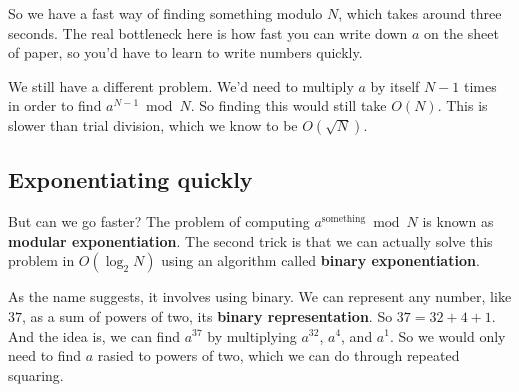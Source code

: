 \documentclass[11pt,paper=letter]{scrartcl}
\begin{document}



So we have a fast way of finding something modulo $N$, which takes around three seconds. The real bottleneck here is how fast you can write down $a$ on the sheet of paper, so you'd have to learn to write numbers quickly.

We still have a different problem. We'd need to multiply $a$ by itself $N-1$ times in order to find $a^{N-1} \bmod N$. So finding this would still take $O(N)$. This is slower than trial division, which we know to be $O(\sqrt{N})$.

\subsection{Exponentiating quickly}

But can we go faster? The problem of computing $a^{\text{something}} \bmod N$ is known as \textbf{modular exponentiation}. The second trick is that we can actually solve this problem in $O(\log_2 N)$ using an algorithm called \textbf{binary exponentiation}.

As the name suggests, it involves using binary. We can represent any number, like $37$, as a sum of powers of two, its \textbf{binary representation}. So $37 = 32 + 4 + 1$. And the idea is, we can find $a^{37}$ by multiplying $a^{32}$, $a^{4}$, and $a^1$. So we would only need to find $a$ rasied to powers of two, which we can do through repeated squaring.
\end{document}
